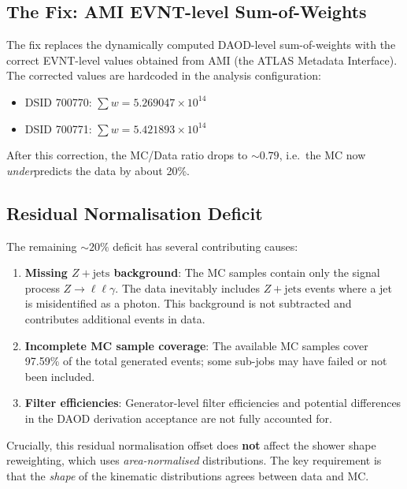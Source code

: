 \documentclass[11pt,a4paper]{article}
\begin{document}
\subsection{The Fix: AMI EVNT-level Sum-of-Weights}

The fix replaces the dynamically computed DAOD-level sum-of-weights with
the correct EVNT-level values obtained from AMI (the ATLAS Metadata
Interface).  The corrected values are hardcoded in the analysis configuration:

\begin{itemize}
  \item DSID 700770: $\sum w = 5.269047 \times 10^{14}$
  \item DSID 700771: $\sum w = 5.421893 \times 10^{14}$
\end{itemize}

After this correction, the MC/Data ratio drops to ${\sim}0.79$, i.e.\ the
MC now \emph{under}predicts the data by about 20\%.

\subsection{Residual Normalisation Deficit}
\label{sec:residual}

The remaining ${\sim}20\%$ deficit has several contributing causes:
\begin{enumerate}
  \item \textbf{Missing $Z{+}\text{jets}$ background}:
    The MC samples contain only the signal process $Z \to \ell\ell\gamma$.
    The data inevitably includes $Z{+}\text{jets}$ events where a jet is
    misidentified as a photon.  This background is not subtracted and
    contributes additional events in data.
  \item \textbf{Incomplete MC sample coverage}:
    The available MC samples cover 97.59\% of the total generated events;
    some sub-jobs may have failed or not been included.
  \item \textbf{Filter efficiencies}:
    Generator-level filter efficiencies and potential differences in
    the DAOD derivation acceptance are not fully accounted for.
\end{enumerate}

Crucially, this residual normalisation offset does \textbf{not} affect the
shower shape reweighting, which uses \emph{area-normalised} distributions.
The key requirement is that the \emph{shape} of the kinematic distributions
agrees between data and MC.

\end{document}
